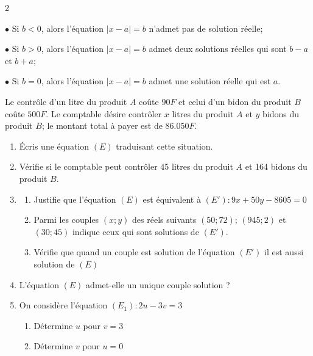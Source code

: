 \begin{multicols*}{2}
{  		$\bullet$ Si $b<0$, alors l'équation $\left|x-a \right |=b$ n'admet pas de solution réelle;
  		
  		$\bullet$  Si $b>0$, alors l'équation $\left|x-a \right |=b$ admet  deux solutions réelles qui sont $b-a$ et $b+a$;
  		
  		$\bullet$  Si $b=0$, alors l'équation $\left|x-a \right |=b$ admet une solution réelle qui est $a$.}
  	
  	
  	Le contrôle d’un litre du produit $A$ coûte $90 F$ et celui d’un bidon du produit $B$ coûte $500 F$. Le comptable désire contrôler $x$ litres du produit $A$ et $y$ bidons du produit $B$; le montant total à payer est de $86.050 F$.
  	
  	\begin{enumerate}
  		\item Écris une équation $(E)$ traduisant cette situation.
  		
  		\item  Vérifie si le comptable peut contrôler 45 litres du produit $A$
  		et 164 bidons du produit $B$.	
  		
  		\item 
  		\begin{enumerate}
  			\item  Justifie que l'équation $ (E) $ est équivalent à $ (E'): 9x + 50y - 8605=0 $
  			\item Parmi les couples $(x;y)$ des réels suivants $(50;72)$; $(945;2)$ et $(30;45)$ indique ceux qui sont solutions de $(E')$.
  			\item  Vérifie que quand un couple est solution de l'équation $(E')$ il est aussi solution de $(E)$
  		\end{enumerate}
  		\item L'équation $(E)$ admet-elle un unique couple solution ?
  		\item  On considère l'équation  $(E_{1}): 2u-3v=3$
  		\begin{enumerate}
  			\item  Détermine $u$ pour $v=3$
  			\item  Détermine $v$ pour $u=0$
  		\end{enumerate}
  	\end{enumerate}
  	\dures
  	 

\end{multicols*}
